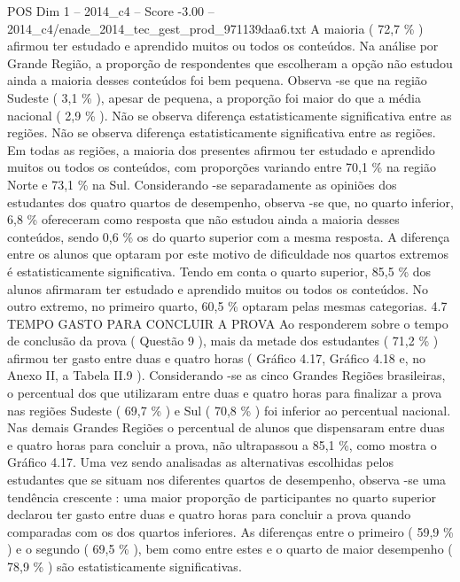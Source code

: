 \begin{textsample}{POS Dim 1 – 2014\_c4 – Score -3.00 – 2014\_c4/enade\_2014\_tec\_gest\_prod\_971139daa6.txt}
A maioria ( 72,7 \% ) afirmou ter estudado e aprendido muitos ou todos os conteúdos.
Na análise por Grande Região, a proporção de respondentes que escolheram a opção não estudou ainda a maioria desses conteúdos foi bem pequena.
Observa -se que na região Sudeste ( 3,1 \% ), apesar de pequena, a proporção foi maior do que a média nacional ( 2,9 \% ).
Não se observa diferença estatisticamente significativa entre as regiões.
Não se observa diferença estatisticamente significativa entre as regiões.
Em todas as regiões, a maioria dos presentes afirmou ter estudado e aprendido muitos ou todos os conteúdos, com proporções variando entre 70,1 \% na região Norte e 73,1 \% na Sul.
Considerando -se separadamente as opiniões dos estudantes dos quatro quartos de desempenho, observa -se que, no quarto inferior, 6,8 \% ofereceram como resposta que não estudou ainda a maioria desses conteúdos, sendo 0,6 \% os do quarto superior com a mesma resposta.
A diferença entre os alunos que optaram por este motivo de dificuldade nos quartos extremos é estatisticamente significativa.
Tendo em conta o quarto superior, 85,5 \% dos alunos afirmaram ter estudado e aprendido muitos ou todos os conteúdos.
No outro extremo, no primeiro quarto, 60,5 \% optaram pelas mesmas categorias. 4.7 TEMPO GASTO PARA CONCLUIR A PROVA Ao responderem sobre o tempo de conclusão da prova ( Questão 9 ), mais da metade dos estudantes ( 71,2 \% ) afirmou ter gasto entre duas e quatro horas ( Gráfico 4.17, Gráfico 4.18 e, no Anexo II, a Tabela II.9 ).
Considerando -se as cinco Grandes Regiões brasileiras, o percentual dos que utilizaram entre duas e quatro horas para finalizar a prova nas regiões Sudeste ( 69,7 \% ) e Sul ( 70,8 \% ) foi inferior ao percentual nacional.
Nas demais Grandes Regiões o percentual de alunos que dispensaram entre duas e quatro horas para concluir a prova, não ultrapassou a 85,1 \%, como mostra o Gráfico 4.17.
Uma vez sendo analisadas as alternativas escolhidas pelos estudantes que se situam nos diferentes quartos de desempenho, observa -se uma tendência crescente : uma maior proporção de participantes no quarto superior declarou ter gasto entre duas e quatro horas para concluir a prova quando comparadas com os dos quartos inferiores.
As diferenças entre o primeiro ( 59,9 \% ) e o segundo ( 69,5 \% ), bem como entre estes e o quarto de maior desempenho ( 78,9 \% ) são estatisticamente significativas.

\end{textsample}
